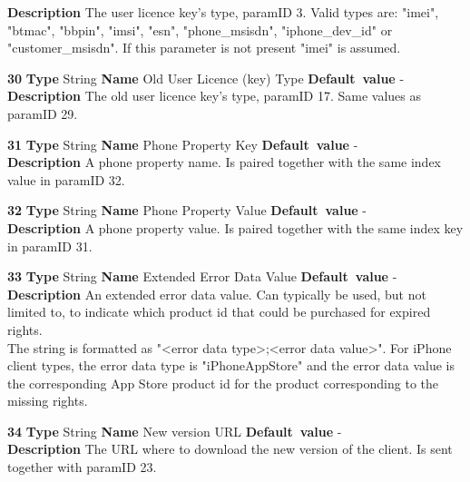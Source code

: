 \begin{list}{\textbf{ParamID}}{}
  \label{User Licence (key) Type}
  \textbf{Description} The user licence key's type, paramID 3. Valid types are:
  "imei", "btmac", "bbpin", "imsi", "esn", "phone\_msisdn", "iphone\_dev\_id" or "customer\_msisdn".
  If this parameter is not present "imei" is assumed.
\item \textbf{30} \textbf{Type} String \textbf{Name} Old User Licence (key) Type
                 \textbf{Default~value} - \\
  \label{Old User Licence (key) Type}
  \textbf{Description} The old user licence key's type, paramID 17. Same values
  as paramID 29.

\item \textbf{31} \textbf{Type} String \textbf{Name} Phone Property Key
                 \textbf{Default~value} - \\
  \label{Phone Property Key}
  \textbf{Description} A phone property name. Is paired together with 
  the same index value in paramID 32.
\item \textbf{32} \textbf{Type} String \textbf{Name} Phone Property Value
                 \textbf{Default~value} - \\
  \label{Phone Property Value}
  \textbf{Description} A phone property value. Is paired together with 
  the same index key in paramID 31.
\item \textbf{33} \textbf{Type} String \textbf{Name} Extended Error Data Value
                 \textbf{Default~value} - \\
  \label{Extended Error Data Value}
  \textbf{Description} An extended error data value. Can typically be used, but not limited to, 
  to indicate which product id that could be purchased for expired rights. \\
  The string is formatted as "<error data type>;<error data value>". For iPhone client types,
  the error data type is "iPhoneAppStore" and the error data value is the corresponding App Store
  product id for the product corresponding to the missing rights.
\item \textbf{34} \textbf{Type} String \textbf{Name} New version URL
                 \textbf{Default~value} - \\
  \label{New version URL}
  \textbf{Description} The URL where to download the new version of the client. 
  Is sent together with paramID 23.
\end{list}


